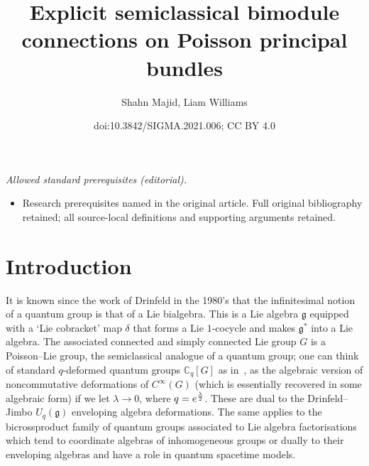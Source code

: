 \documentclass[10pt,a4paper]{amsart}
\title{Explicit semiclassical bimodule connections on Poisson principal bundles}
\author{Shahn Majid, Liam Williams}
\date{doi:10.3842/SIGMA.2021.006; CC BY 4.0}
\numberwithin{equation}{section}
\newcommand{\C}{{\mathbb{C}}}
\newcommand{\<}{{\langle}}
\renewcommand{\>}{{\rangle}}
\newcommand{\cg}{{\mathfrak{g}}}
\begin{document}
\maketitle
\noindent\textit{Allowed standard prerequisites (editorial).}\begin{itemize}
\item Research prerequisites named in the original article. Full original bibliography retained; all source-local definitions and supporting arguments retained.
\end{itemize}\medskip
\section{Introduction}
It is known since the work of Drinfeld in the 1980's \cite{Dri:ham,Drinfeld} that the infinitesimal notion of a quantum group is that of a Lie bialgebra. This is a Lie algebra $\mathfrak{g}$ equipped with a `Lie cobracket' map $\delta$ that forms a Lie $1$-cocycle and makes $\mathfrak{g}^*$ into a Lie algebra. The associated connected and simply connected Lie group $G$ is a Poisson--Lie group, the semiclassical analogue of a quantum group; one can think of standard $q$-deformed quantum groups $\C_q[G]$ as in~\cite{FRT}, as the algebraic version of noncommutative deformations of $C^\infty(G)$ (which is essentially recovered in some algebraic form) if we let $\lambda\to 0$, where $q=e^{\lambda\over 2}$. These are dual to the Drinfeld--Jimbo $U_q(\cg)$ enveloping algebra deformations. The same applies to the bicrossproduct family of quantum groups associated to Lie algebra factorisations~\cite{Ma:book} which tend to coordinate algebras of inhomogeneous groups or dually to their enveloping algebras and have a role in quantum spacetime models.
\end{document}
